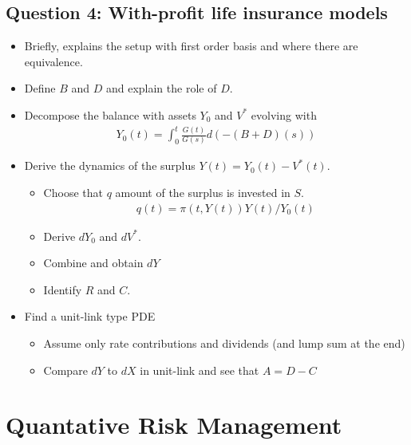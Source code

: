 \documentclass[a4paper,12pt,openany]{book}
\providecommand{\tightlist}{%
 \setlength{\itemsep}{0pt}\setlength{\parskip}{0pt}}
\begin{document}
\newpage

\hypertarget{question-4-with-profit-life-insurance-models}{%
\section{Question 4: With-profit life insurance models}\label{question-4-with-profit-life-insurance-models}}

\begin{itemize}
\tightlist
\item
  Briefly, explains the setup with first order basis and where there are equivalence.
\item
  Define \(B\) and \(D\) and explain the role of \(D\).
\item
  Decompose the balance with assets \(Y_0\) and \(V^*\) evolving with
  \begin{align*}
    Y_0(t)=\int_0^t\frac{G(t)}{G(s)}d(-(B+D)(s))
    \end{align*}
\item
  Derive the dynamics of the surplus \(Y(t)=Y_0(t)-V^*(t)\).

  \begin{itemize}
  \tightlist
  \item
    Choose that \(q\) amount of the surplus is invested in \(S\).
    \begin{align*}
    q(t)=\pi(t,Y(t))Y(t)/Y_0(t)
    \end{align*}
  \item
    Derive \(dY_0\) and \(dV^*\).
  \item
    Combine and obtain \(dY\)
  \item
    Identify \(R\) and \(C\).
  \end{itemize}
\item
  Find a unit-link type PDE

  \begin{itemize}
  \tightlist
  \item
    Assume only rate contributions and dividends (and lump sum at the end)
  \item
    Compare \(dY\) to \(dX\) in unit-link and see that \(A=D-C\)
  \end{itemize}
\end{itemize}

\hypertarget{quantative-risk-management}{%
\chapter{Quantative Risk Management}\label{quantative-risk-management}}
\end{document}
